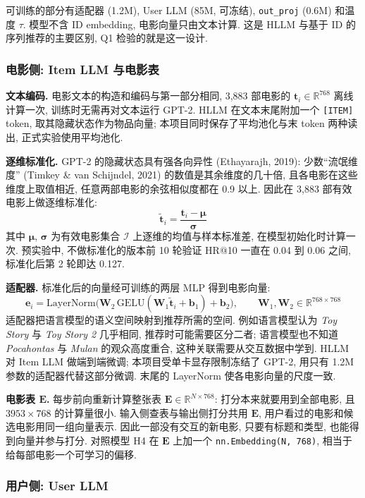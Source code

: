 \documentclass{article}
\begin{document}
可训练的部分有适配器 (1.2M), User LLM (85M, 可冻结), \texttt{out\_proj} (0.6M) 和温度 $\tau$. 模型不含 ID embedding, 电影向量只由文本计算. 这是 HLLM 与基于 ID 的序列推荐的主要区别, Q1 检验的就是这一设计.

\subsubsection{电影侧: Item LLM 与电影表}
\label{sec:itemside}

\textbf{文本编码.} 电影文本的构造和编码与第一部分相同, 3,883 部电影的 $\mathbf{t}_i\in\mathbb{R}^{768}$ 离线计算一次, 训练时无需再对文本运行 GPT-2. HLLM 在文本末尾附加一个 \texttt{[ITEM]} token, 取其隐藏状态作为物品向量; 本项目同时保存了平均池化与末 token 两种读出, 正式实验使用平均池化.

\textbf{逐维标准化.} GPT-2 的隐藏状态具有强各向异性 (Ethayarajh, 2019): 少数``流氓维度'' (Timkey \& van Schijndel, 2021) 的数值是其余维度的几十倍, 且各电影在这些维度上取值相近, 任意两部电影的余弦相似度都在 0.9 以上. 因此在 3,883 部有效电影上做逐维标准化:
\[
\tilde{\mathbf{t}}_i = \frac{\mathbf{t}_i - \boldsymbol{\mu}}{\boldsymbol{\sigma}}
\]
其中 $\boldsymbol{\mu}$, $\boldsymbol{\sigma}$ 为有效电影集合 $\mathcal{I}$ 上逐维的均值与样本标准差, 在模型初始化时计算一次. 预实验中, 不做标准化的版本前 10 轮验证 HR@10 一直在 0.04 到 0.06 之间, 标准化后第 2 轮即达 0.127.

\textbf{适配器.} 标准化后的向量经可训练的两层 MLP 得到电影向量:
\[
\mathbf{e}_i = \mathrm{LayerNorm}\big(\mathbf{W}_2\,\mathrm{GELU}(\mathbf{W}_1\tilde{\mathbf{t}}_i + \mathbf{b}_1) + \mathbf{b}_2\big),\qquad \mathbf{W}_1,\mathbf{W}_2\in\mathbb{R}^{768\times 768}
\]
适配器把语言模型的语义空间映射到推荐所需的空间. 例如语言模型认为 \emph{Toy Story} 与 \emph{Toy Story 2} 几乎相同, 推荐时可能需要区分二者; 语言模型也不知道 \emph{Pocahontas} 与 \emph{Mulan} 的观众高度重合, 这种关联需要从交互数据中学到. HLLM 对 Item LLM 做端到端微调; 本项目受单卡显存限制冻结了 GPT-2, 用只有 1.2M 参数的适配器代替这部分微调. 末尾的 LayerNorm 使各电影向量的尺度一致.

\textbf{电影表 $\mathbf{E}$.} 每步前向重新计算整张表 $\mathbf{E}\in\mathbb{R}^{N\times 768}$: 打分本来就要用到全部电影, 且 $3953\times 768$ 的计算量很小. 输入侧查表与输出侧打分共用 $\mathbf{E}$, 用户看过的电影和候选电影用同一组向量表示. 因此一部没有交互的新电影, 只要有标题和类型, 也能得到向量并参与打分. 对照模型 H4 在 $\mathbf{E}$ 上加一个 \texttt{nn.Embedding(N, 768)}, 相当于给每部电影一个可学习的偏移.

\subsubsection{用户侧: User LLM}
\end{document}
